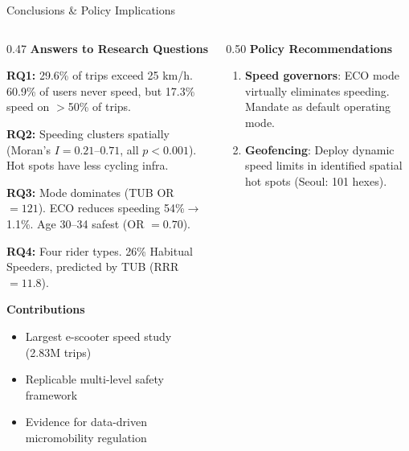 \documentclass[aspectratio=169, 9pt]{beamer}
\begin{document}
\begin{frame}{Conclusions \& Policy Implications}
\begin{columns}[T]
\begin{column}{0.47\textwidth}
  \footnotesize
  \textbf{\textcolor{boxbrown}{Answers to Research Questions}}

  \vspace{2pt}
  \textbf{RQ1:} 29.6\% of trips exceed 25 km/h. 60.9\% of users never speed, but 17.3\% speed on $>$50\% of trips.

  \vspace{2pt}
  \textbf{RQ2:} Speeding clusters spatially (Moran's $I{=}0.21$--$0.71$, all $p{<}0.001$). Hot spots have less cycling infra.

  \vspace{2pt}
  \textbf{RQ3:} Mode dominates (TUB OR $= 121$). ECO reduces speeding 54\%$\to$1.1\%. Age 30--34 safest (OR $= 0.70$).

  \vspace{2pt}
  \textbf{RQ4:} Four rider types. 26\% Habitual Speeders, predicted by TUB (RRR $= 11.8$).

  \vspace{4pt}
  \textbf{\textcolor{boxbrown}{Contributions}}
  \begin{itemize}\setlength\itemsep{0pt}\footnotesize
    \item Largest e-scooter speed study (2.83M trips)
    \item Replicable multi-level safety framework
    \item Evidence for data-driven micromobility regulation
  \end{itemize}
\end{column}
\begin{column}{0.50\textwidth}
  \footnotesize
  \textbf{\textcolor{boxbrown}{Policy Recommendations}}

  \vspace{2pt}
  \begin{enumerate}\setlength\itemsep{2pt}\footnotesize
    \item \textbf{Speed governors}: ECO mode virtually eliminates speeding. Mandate as default operating mode.

    \item \textbf{Geofencing}: Deploy dynamic speed limits in identified spatial hot spots (Seoul: 101 hexes).


\end{enumerate}
\end{column}
\end{columns}
\end{frame}
\end{document}
